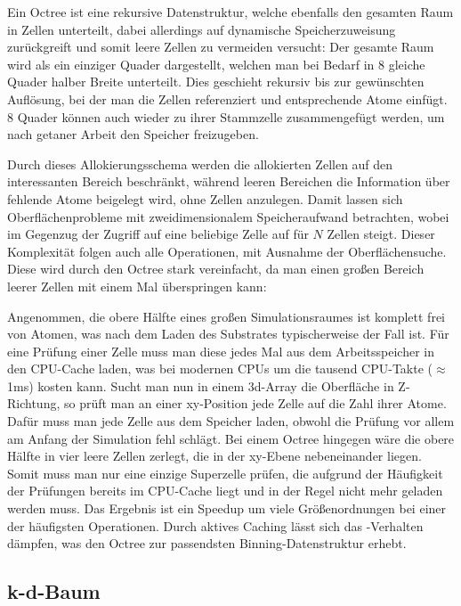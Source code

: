 Ein Octree ist eine rekursive Datenstruktur, welche ebenfalls den gesamten Raum in Zellen unterteilt, dabei allerdings auf dynamische Speicherzuweisung zurückgreift und somit leere Zellen zu vermeiden versucht:
Der gesamte Raum wird als ein einziger Quader dargestellt, welchen man bei Bedarf in 8 gleiche Quader halber Breite unterteilt.
Dies geschieht rekursiv bis zur gewünschten Auflösung, bei der man die Zellen referenziert und entsprechende Atome einfügt.
8 Quader können auch wieder zu ihrer Stammzelle zusammengefügt werden, um nach getaner Arbeit den Speicher freizugeben.

Durch dieses Allokierungsschema werden die allokierten Zellen auf den interessanten Bereich beschränkt, während leeren Bereichen die Information über fehlende Atome beigelegt wird, ohne Zellen anzulegen.
Damit lassen sich Oberflächenprobleme mit zweidimensionalem Speicheraufwand betrachten, wobei im Gegenzug der Zugriff auf eine beliebige Zelle auf  für $N$ Zellen steigt.
Dieser Komplexität folgen auch alle Operationen, mit Ausnahme der Oberflächensuche.
Diese wird durch den Octree stark vereinfacht, da man einen großen Bereich leerer Zellen mit einem Mal überspringen kann:

Angenommen, die obere Hälfte eines großen Simulationsraumes ist komplett frei von Atomen, was nach dem Laden des Substrates typischerweise der Fall ist.
Für eine Prüfung einer Zelle muss man diese jedes Mal aus dem Arbeitsspeicher in den CPU-Cache laden, was bei modernen CPUs um die tausend CPU-Takte ($\approx$1ms) kosten kann.
Sucht man nun in einem 3d-Array die Oberfläche in Z-Richtung, so prüft man an einer xy-Position jede Zelle auf die Zahl ihrer Atome.
Dafür muss man jede Zelle aus dem Speicher laden, obwohl die Prüfung vor allem am Anfang der Simulation fehl schlägt.
Bei einem Octree hingegen wäre die obere Hälfte in vier leere Zellen zerlegt, die in der xy-Ebene nebeneinander liegen.
Somit muss man nur eine einzige Superzelle prüfen, die aufgrund der Häufigkeit der Prüfungen bereits im CPU-Cache liegt und in der Regel nicht mehr geladen werden muss.
Das Ergebnis ist ein Speedup um viele Größenordnungen bei einer der häufigsten Operationen.
Durch aktives Caching lässt sich das -Verhalten dämpfen, was den Octree zur passendsten Binning-Datenstruktur erhebt.

\subsection{k-d-Baum}

